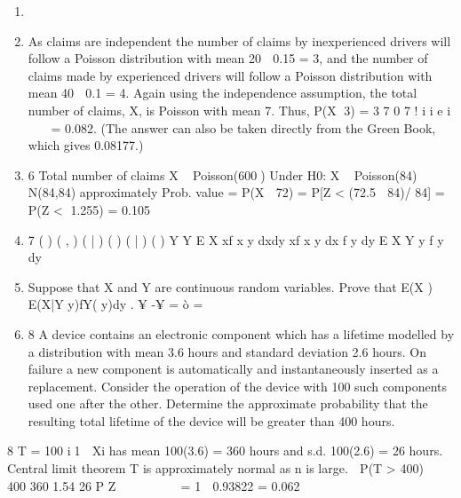 \documentclass[a4paper,12pt]{article}
\begin{document}
\begin{enumerate}
    \item 

\item  As claims are independent the number of claims by inexperienced drivers will
follow a Poisson distribution with mean 20  0.15 = 3, and the number of claims
made by experienced drivers will follow a Poisson distribution with mean
40  0.1 = 4. Again using the independence assumption, the total number of
claims, X, is Poisson with mean 7.
Thus, P(X 3) =
3
7
0
7
!
i
i
e
i


 = 0.082.
(The answer can also be taken directly from the Green Book, which gives
0.08177.)
\item 6 Total number of claims X ~ Poisson(600)
Under H0: X ~ Poisson(84) ~ N(84,84) approximately
Prob. value = P(X  72) = P[Z < (72.5  84)/	84] = P(Z < 1.255) = 0.105
\item 7 ( ) ( , ) ( | ) ( ) ( | ) ( ) Y Y E X xf x y dxdy xf x y dx f y dy E X Y y f y dy

\item Suppose that X and Y are continuous random variables.
Prove that E(X ) E(X|Y y)fY( y)dy .
¥
-¥
= ò = 
\newpage
\item 8 A device contains an electronic component which has a lifetime modelled by a
distribution with mean 3.6 hours and standard deviation 2.6 hours. On failure
a new component is automatically and instantaneously inserted as a
replacement.
Consider the operation of the device with 100 such components used one after
the other. Determine the approximate probability that the resulting total
lifetime of the device will be greater than 400 hours. 

\end{enumerate}
8 T =
100
i1
 Xi has mean 100(3.6) = 360 hours
and s.d. 100(2.6) = 26 hours.
Central limit theorem 
 T is approximately normal as n is large.
 P(T > 400) 

400 360
1.54
26
P Z
  
   
 	
= 1  0.93822 = 0.062
\end{document}
